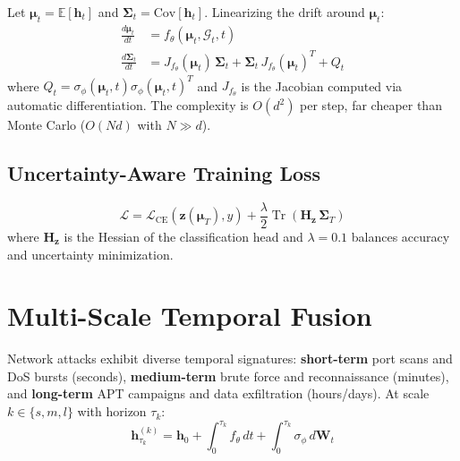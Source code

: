 \documentclass[10pt,journal,compsoc]{IEEEtran}
\newcommand{\E}{\mathbb{E}}
\newcommand{\G}{\mathcal{G}}
\DeclareMathOperator{\Tr}{Tr}
\begin{document}
Let $\boldsymbol{\mu}_t = \E[\mathbf{h}_t]$ and $\boldsymbol{\Sigma}_t = \text{Cov}[\mathbf{h}_t]$. Linearizing the drift around $\boldsymbol{\mu}_t$:
\begin{align}
\frac{d\boldsymbol{\mu}_t}{dt} &= f_\theta(\boldsymbol{\mu}_t, \G_t, t) \label{eq:mean_ode} \\
\frac{d\boldsymbol{\Sigma}_t}{dt} &= J_{f_\theta}(\boldsymbol{\mu}_t)\,\boldsymbol{\Sigma}_t + \boldsymbol{\Sigma}_t\,J_{f_\theta}(\boldsymbol{\mu}_t)^T + Q_t \label{eq:cov_ode}
\end{align}
where $Q_t = \sigma_\phi(\boldsymbol{\mu}_t,t)\sigma_\phi(\boldsymbol{\mu}_t,t)^T$ and $J_{f_\theta}$ is the Jacobian computed via automatic differentiation. The complexity is $O(d^2)$ per step, far cheaper than Monte Carlo ($O(Nd)$ with $N \gg d$).

\vspace{-0.2cm}
\subsection{Uncertainty-Aware Training Loss}

\begin{equation}
\mathcal{L} = \mathcal{L}_{\text{CE}}(\mathbf{z}(\boldsymbol{\mu}_T), y) + \frac{\lambda}{2}\Tr(\mathbf{H}_{\mathbf{z}}\,\boldsymbol{\Sigma}_T)
\end{equation}
where $\mathbf{H}_{\mathbf{z}}$ is the Hessian of the classification head and $\lambda=0.1$ balances accuracy and uncertainty minimization.

\vspace{-0.2cm}
\section{Multi-Scale Temporal Fusion}
\label{sec:multiscale}

Network attacks exhibit diverse temporal signatures: \textbf{short-term} port scans and DoS bursts (seconds), \textbf{medium-term} brute force and reconnaissance (minutes), and \textbf{long-term} APT campaigns and data exfiltration (hours/days). At scale $k \in \{s,m,l\}$ with horizon $\tau_k$:
\begin{equation}
\mathbf{h}_{\tau_k}^{(k)} = \mathbf{h}_0 + \int_0^{\tau_k} f_\theta\,dt + \int_0^{\tau_k} \sigma_\phi\,d\mathbf{W}_t
\end{equation}
\end{document}
